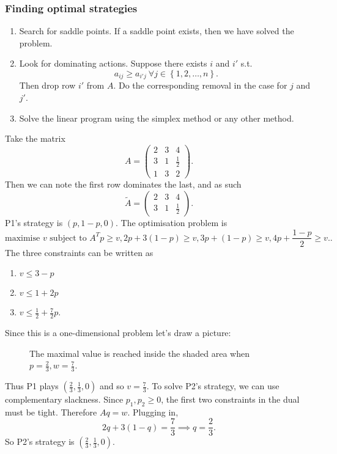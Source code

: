 \documentclass[egregdoesnotlikesansseriftitles,a4paper]{scrartcl}
\begin{document}
\subsubsection{Finding optimal strategies}
\begin{enumerate}
	\item Search for saddle points. If a saddle point exists, then we have solved the problem.
	\item Look for dominating actions. Suppose there exists $i$ and $i'$ s.t. \[
	a_{ij} \geq a_{i'j} \ \forall j \in \left\{1,2,\ldots ,n\right\}
	.\] 
	Then drop row $i'$ from $A$. Do the corresponding removal in the case for $j$ and $j'$.
	\item Solve the linear program using the simplex method or any other method.
\end{enumerate}
\begin{example*}
	Take the matrix \[
	A=\begin{pmatrix} 2&3&4\\3&1&\frac{1}{2}\\1&3&2 \end{pmatrix}
	.\] Then we can note the first row dominates the last, and as such \[
	\tilde{A}=\begin{pmatrix} 2&3&4\\3&1&\frac{1}{2} \end{pmatrix}
	.\] 
	P1's strategy is $(p,1-p,0)$. The optimisation problem is \[
	\text{maximise } v \text{ subject to } A^{T}p \geq v, 2p+ 3 (1-p) \geq v, 3p+(1-p) \geq v, 4p + \frac{1-p}{2}\geq v.
	.\] The three constraints can be written as 
	\begin{enumerate}
		\item $v \leq 3-p$ 
		\item $v \leq 1+2p$ 
		\item $v \leq \frac{1}{2}+\frac{7}{2}p$.
	\end{enumerate}
	Since this is a one-dimensional problem let's draw a picture:
	\begin{figure}[H]
		\centering
		\caption{The maximal value is reached inside the shaded area when $p=\frac{2}{3}, w=\frac{7}{3}$.}
	\end{figure}
	Thus P1 plays $(\frac{2}{3},\frac{1}{3},0)$ and so $v=\frac{7}{3}$. To solve P2's strategy, we can use complementary slackness. Since $p_1 ,p_2 \geq 0$, the first two constraints in the dual must be tight. Therefore $Aq=w$. Plugging in, \[
	2q+3 (1-q)=\frac{7}{3} \implies q=\frac{2}{3}
	.\] So P2's strategy is $(\frac{2}{3},\frac{1}{3},0)$.
\end{example*}
\end{document}
